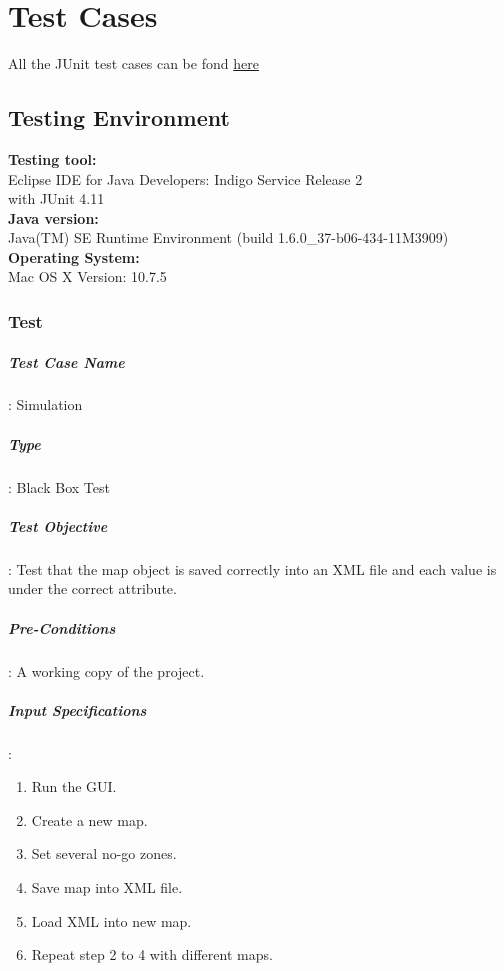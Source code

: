 \documentclass[12pt, a4paper]{report}
\begin{document}
\chapter{Test Cases} %
\label{cha:test_cases}
%
%
All the JUnit test cases can be fond \href{https://version-control.adelaide.edu.au/svn/sep2012-13/Code/Working Copy/Version 0.3/src/Tests/XMLDocumentsTest.java}{here}\\

\section{Testing Environment}
\textbf{Testing tool: } \\
Eclipse IDE for Java Developers: Indigo Service Release 2 
\\with JUnit 4.11\\
\textbf{Java version: }\\
Java(TM) SE Runtime Environment (build 1.6.0\_37-b06-434-11M3909)\\
\textbf{Operating System: }\\
Mac OS X Version: 10.7.5\\


\addtocounter{casecounter}{1}
\subsection{Test }
\paragraph{Test Case Name}: Simulation
\paragraph{Type}: Black Box Test
\paragraph{Test Objective}: Test that the map object is saved correctly into an XML file and each value is under the correct attribute.
\paragraph{Pre-Conditions}: A working copy of the project. 
\paragraph{Input Specifications}: 
\begin{enumerate}
	\item Run the GUI.
	\item Create a new map.
	\item Set several no-go zones.
	\item Save map into XML file.
	\item Load XML into new map.
	\item Repeat step 2 to 4 with different maps. 
\end{enumerate}
	
\end{document}
